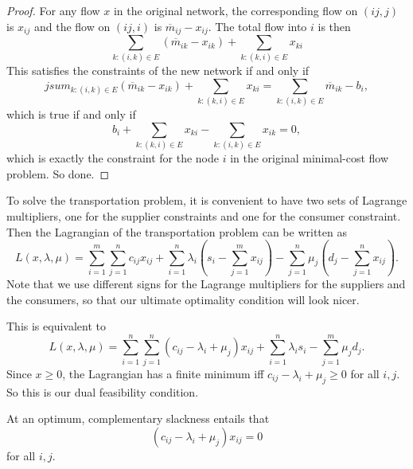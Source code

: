 \documentclass[a4paper]{article}
\begin{document}
\begin{proof}
  For any flow $x$ in the original network, the corresponding flow on $(ij, j)$ is $x_{ij}$ and the flow on $(ij, i)$ is $\overline{m}_{ij} - x_{ij}$.  The total flow into $i$ is then
  \[
   \sum_{k: (i, k)\in E}(\overline{m}_{ik} - x_{ik}) + \sum_{k: (k, i)\in E}x_{ki}
  \]
  This satisfies the constraints of the new network if and only if
  \[
   jsum_{k: (i, k)\in E}(\overline{m}_{ik} - x_{ik}) + \sum_{k: (k, i)\in E}x_{ki} = \sum_{k: (i, k)\in E}\overline{m}_{ik} - b_i,
  \]
  which is true if and only if
  \[
    b_i + \sum_{k:(k, i)\in E}x_{ki} - \sum_{k: (i, k)\in E}x_{ik} = 0,
  \]
  which is exactly the constraint for the node $i$ in the original minimal-cost flow problem. So done.
\end{proof}
To solve the transportation problem, it is convenient to have two sets of Lagrange multipliers, one for the supplier constraints and one for the consumer constraint. Then the Lagrangian of the transportation problem can be written as
\[
  L(x, \lambda, \mu) = \sum_{i = 1}^m\sum_{j = 1}^n c_{ij}x_{ij} + \sum_{i = 1}^n \lambda_i\left(s_i - \sum_{j = 1}^m x_{ij}\right) - \sum_{j = 1}^n \mu_j\left(d_j - \sum_{j = 1}^n x_{ij}\right).
\]
Note that we use different signs for the Lagrange multipliers for the suppliers and the consumers, so that our ultimate optimality condition will look nicer.

This is equivalent to
\[
  L(x, \lambda, \mu) = \sum_{i = 1}^n \sum_{j = 1}^n (c_{ij} - \lambda_i + \mu_j)x_{ij} + \sum_{i = 1}^n \lambda_i s_i - \sum_{j = 1}^m \mu_j d_j.
\]
Since $x \geq 0$, the Lagrangian has a finite minimum iff $c_{ij} - \lambda_i + \mu_j \geq 0$ for all $i, j$. So this is our dual feasibility condition.

At an optimum, complementary slackness entails that
\[
  (c_{ij} - \lambda_i + \mu_j)x_{ij} = 0
\]
for all $i, j$.
\end{document}
